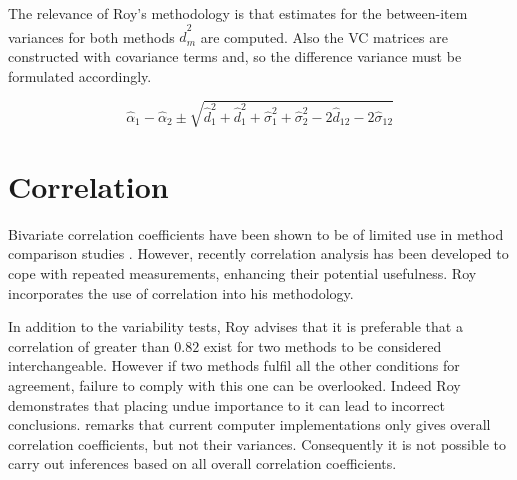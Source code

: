\documentclass[12pt, a4paper]{article}
\theoremstyle{plain}
\theoremstyle{definition}
\theoremstyle{remark}
\begin{document}
	The relevance of Roy's methodology is that estimates for the between-item variances for both methods $\hat{d}^2_m$ are computed. Also the VC matrices are constructed with covariance
	terms and, so the difference variance must be formulated accordingly.
	
	
	\[
	\hat{\alpha}_1 - \hat{\alpha}_2 \pm \sqrt{ \hat{d}^2_1  +
		\hat{d}^2_1 + \hat{\sigma}^2_1 + \hat{\sigma}^2_2 - 2 \hat{d}_{12}
		- 2 \hat{\sigma}_12}
	\]
	

	


	
	
	
%

	

	
	
	
	
\section{Correlation}


Bivariate correlation coefficients have been shown to be of
limited use in method comparison studies \citep{BA86}. However,
recently correlation analysis has been developed to cope with
repeated measurements, enhancing their potential usefulness. Roy
incorporates the use of correlation into his methodology.

	In addition to the variability tests, Roy advises that it is preferable that a correlation of greater than $0.82$ exist for two methods to be considered interchangeable. However if two methods fulfil all the other conditions for agreement, failure to comply with this one can be overlooked. Indeed Roy demonstrates that placing undue importance to it can lead to incorrect conclusions. \citet{ARoy2009} remarks that current computer implementations only gives overall correlation coefficients, but not their variances. Consequently it is not possible to carry out inferences based on all overall correlation coefficients.
\end{document}
